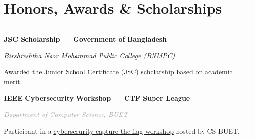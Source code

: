 \documentclass[10pt]{article}
\newcommand{\sectionrule}{\vspace{-2pt}\noindent\textcolor{rulegray}{\rule{\linewidth}{1pt}}\vspace{6pt}}
\newcommand{\cvsection}[1]{%
  \Needspace{6\baselineskip}%
  \section{#1}\sectionrule%
}
\newcommand{\cvitem}[2]{%
  \Needspace{4\baselineskip}%
  \par\vspace{6pt}\noindent\textbf{#1}\hfill\textit{\textcolor{darkgray}{#2}}\par\vspace{1pt}%
}
\newcommand{\cvsub}[1]{\textit{\textcolor{darkgray}{#1}}\par\vspace{2pt}}
\begin{document}
\cvsection{Honors, Awards \& Scholarships}

\cvitem{JSC Scholarship --- Government of Bangladesh}{}
\cvsub{\href{https://www.noormohammadcollege.ac.bd/}{Birshreshtha Noor Mohammad Public College (BNMPC)}}
Awarded the Junior School Certificate (JSC) scholarship based on academic merit.

\cvitem{IEEE Cybersecurity Workshop --- CTF Super League}{}
\cvsub{Department of Computer Science, BUET}
Participant in a \href{https://drive.google.com/file/d/1l-XHQ-Q6xGNV-Jd1EeN1mTSHXqQFOaqH/view?usp=sharing}{cybersecurity capture-the-flag workshop} hosted by CS-BUET.
\end{document}
